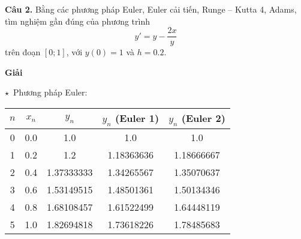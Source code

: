 \textbf{Câu 2.} Bằng các phương pháp Euler, Euler cải tiến, Runge – Kutta 4, Adams, tìm nghiệm gần đúng của phương trình $$y'=y-\frac{2x}{y}$$ trên đoạn $[0;1]$, với $y(0)=1$ và $h=0.2$.\par
\textbf{Giải}\par

$\star$~Phương pháp Euler:
\begin{longtable}{|c|c|c|c|c|}\hline
	$n$ & $x_n$ & $y_n$      & $y_n$ (Euler 1) & $y_n$ (Euler 2) \\ \hline
	\endhead
	0   & 0.0   & 1.0        & 1.0             & 1.0             \\ \hline
	1   & 0.2   & 1.2        & 1.18363636      & 1.18666667      \\ \hline
	2   & 0.4   & 1.37333333 & 1.34265567      & 1.35070637      \\ \hline
	3   & 0.6   & 1.53149515 & 1.48501361      & 1.50134346      \\ \hline
	4   & 0.8   & 1.68108457 & 1.61522499      & 1.64448119      \\ \hline
	5   & 1.0   & 1.82694818 & 1.73618226      & 1.78485683      \\ \hline
\end{longtable}

